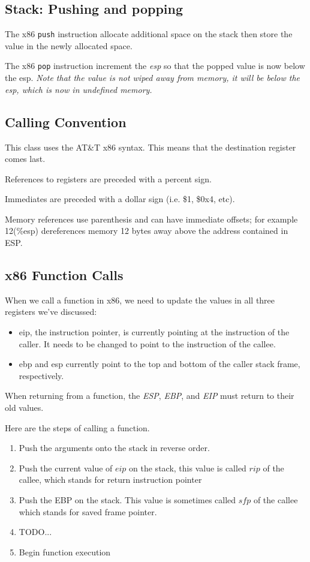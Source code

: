 \documentclass{article}
\begin{document}
\subsection{Stack: Pushing and popping}
The x86 \lstinline{push} instruction allocate additional space on the stack then store the value in the newly allocated space.

The x86 \lstinline{pop} instruction increment the \emph{esp} so that the popped value is now below the esp. \emph{Note that the value is not wiped away from memory, it will be below the esp, which is now in undefined memory.}

\subsection{Calling Convention}
This class uses the AT\&T x86 syntax. This means that the destination register comes last.

References to registers are preceded with a percent sign.

Immediates are preceded with a dollar sign (i.e. \$1, \$0x4, etc).

Memory references use parenthesis and can have immediate offsets; for example 12(\%esp) dereferences memory 12 bytes away above the address contained in ESP.

\subsection{x86 Function Calls}
When we call a function in x86, we need to update the values in all three registers we've discussed:
\begin{itemize}
    \item eip, the instruction pointer, is currently pointing at the instruction of the caller. It needs to be changed to point to the instruction of the callee.
    \item ebp and esp currently point to the top and bottom of the caller stack frame, respectively.
\end{itemize}

When returning from a function, the \emph{ESP}, \emph{EBP}, and \emph{EIP} must return to their old values.

Here are the steps of calling a function.

\begin{enumerate}
    \item Push the arguments onto the stack in reverse order.
    \item Push the current value of $eip$ on the stack, this value is called $rip$ of the callee, which stands for return instruction pointer
    \item Push the EBP on the stack. This value is sometimes called $sfp$ of the callee which stands for saved frame pointer.
    \item {\color{red} TODO...}
    \item Begin function execution
\end{enumerate}
\end{document}
